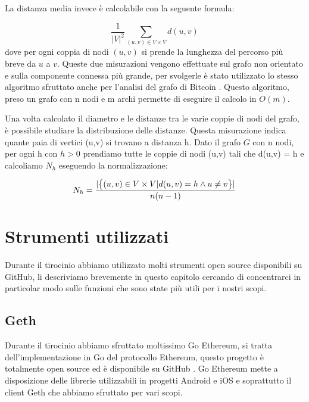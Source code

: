 \documentclass[12pt]{report}
\begin{document}
La distanza media invece è calcolabile con la seguente formula:

\begin{equation}
\frac{1} {|V|^{2}} \sum_{(u,v) \in V \times V} d(u, v) 
\end{equation}
dove per ogni coppia di nodi $(u,v)$ si prende la lunghezza del percorso più breve da $u$ a $v$.
Queste due misurazioni vengono effettuate sul grafo non orientato e sulla componente connessa più grande, per svolgerle è stato utilizzato lo stesso algoritmo sfruttato anche per l'analisi del grafo di Bitcoin \cite{maesa2016uncovering} \cite{maesa2016analysis} \cite{maesa2017data} \cite{maesa2017detecting}.
Questo algoritmo, preso un grafo con n nodi e m archi permette di eseguire il calcolo in $O(m)$.

Una volta calcolato il diametro e le distanze tra le varie coppie di nodi del grafo, è possibile studiare la distribuzione delle distanze.
Questa misurazione indica quante paia di vertici (u,v) si trovano a distanza h.
Dato il grafo $G$ con n nodi, per ogni h con $h > 0$ prendiamo tutte le coppie di nodi (u,v) tali che d(u,v) = h e calcoliamo $N_h$ eseguendo la normalizzazione:

\begin{equation}
N_h = \frac{|\big\{(u,v) \in V\times V \space | \space d(u,v) = h \land u \neq v\big\}|} {n(n-1)}
\end{equation}


\chapter{Strumenti utilizzati}

Durante il tirocinio abbiamo utilizzato molti strumenti open source disponibili su GitHub, li descriviamo brevemente in questo capitolo cercando di concentrarci in particolar modo sulle funzioni che sono state più utili per i nostri scopi.

\section{Geth}

Durante il tirocinio abbiamo sfruttato moltissimo Go Ethereum, si tratta dell'implementazione in Go \cite{GoLang} del protocollo Ethereum, questo progetto è totalmente open source ed è disponibile su GitHub \cite{goEthereum}.
Go Ethereum mette a disposizione delle librerie utilizzabili in progetti Android e iOS e soprattutto il client Geth che abbiamo sfruttato per vari scopi.
\end{document}
